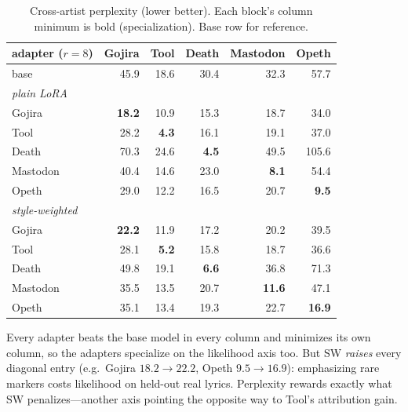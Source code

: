 \documentclass[runningheads]{llncs}
\begin{document}
\begin{table}[t]
\centering\small
\caption{Cross-artist perplexity (lower better). Each block's column minimum is bold (specialization). Base row for reference.}
\label{tab:ppl}
\begin{tabular}{lrrrrr}
\toprule
adapter ($r{=}8$) & Gojira & Tool & Death & Mastodon & Opeth \\
\midrule
base            & 45.9 & 18.6 & 30.4 & 32.3 & 57.7 \\
\midrule
\multicolumn{6}{l}{\itshape plain LoRA}\\
Gojira   & \textbf{18.2} & 10.9 & 15.3 & 18.7 & 34.0 \\
Tool     & 28.2 & \textbf{4.3} & 16.1 & 19.1 & 37.0 \\
Death    & 70.3 & 24.6 & \textbf{4.5} & 49.5 & 105.6 \\
Mastodon & 40.4 & 14.6 & 23.0 & \textbf{8.1} & 54.4 \\
Opeth    & 29.0 & 12.2 & 16.5 & 20.7 & \textbf{9.5} \\
\midrule
\multicolumn{6}{l}{\itshape style-weighted}\\
Gojira   & \textbf{22.2} & 11.9 & 17.2 & 20.2 & 39.5 \\
Tool     & 28.1 & \textbf{5.2} & 15.8 & 18.7 & 36.6 \\
Death    & 49.8 & 19.1 & \textbf{6.6} & 36.8 & 71.3 \\
Mastodon & 35.5 & 13.5 & 20.7 & \textbf{11.6} & 47.1 \\
Opeth    & 35.1 & 13.4 & 19.3 & 22.7 & \textbf{16.9} \\
\bottomrule
\end{tabular}
\end{table}

Every adapter beats the base model in every column and minimizes its own column, so the adapters specialize on the likelihood axis too. But SW \emph{raises} every diagonal entry (e.g.\ Gojira $18.2\!\rightarrow\!22.2$, Opeth $9.5\!\rightarrow\!16.9$): emphasizing rare markers costs likelihood on held-out real lyrics. Perplexity rewards exactly what SW penalizes---another axis pointing the opposite way to Tool's attribution gain.
\end{document}
